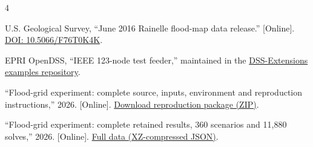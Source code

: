 \documentclass[conference]{IEEEtran}
\begin{document}
\begin{thebibliography}{4}

 U.S. Geological Survey, ``June 2016 Rainelle flood-map data release.'' [Online]. \href{https://doi.org/10.5066/F76T0K4K}{DOI: 10.5066/F76T0K4K}.

 EPRI OpenDSS, ``IEEE 123-node test feeder,'' maintained in the \href{https://github.com/dss-extensions/electricdss-tst}{DSS-Extensions examples repository}.

 ``Flood-grid experiment: complete source, inputs, environment and reproduction instructions,'' 2026. [Online]. \href{https://dhruvs.vercel.app/research/flood-grid/reproducibility.zip}{Download reproduction package (ZIP)}.

 ``Flood-grid experiment: complete retained results, 360 scenarios and 11,880 solves,'' 2026. [Online]. \href{https://dhruvs.vercel.app/research/flood-grid/files/reference/study.json.xz}{Full data (XZ-compressed JSON)}.

\end{thebibliography}
\end{document}
